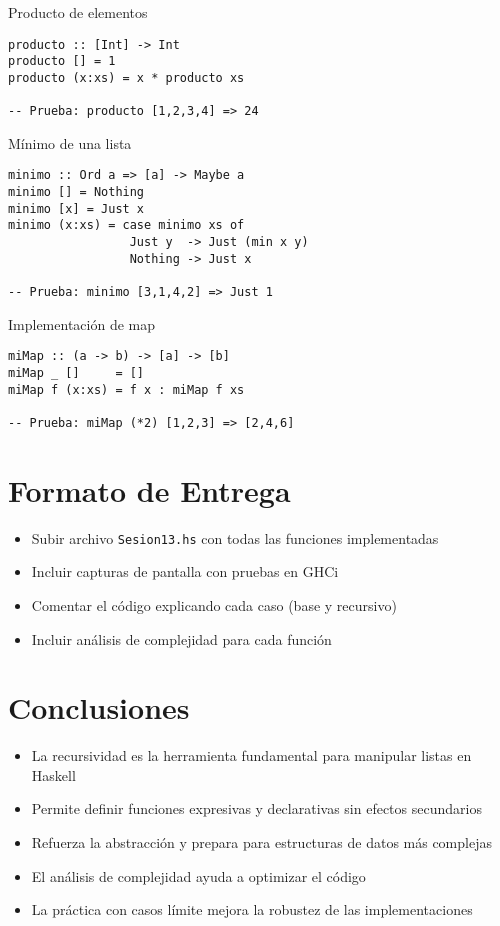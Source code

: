\documentclass[12pt]{article}
\begin{document}
\begin{solucion}{Producto de elementos}
\begin{lstlisting}
producto :: [Int] -> Int
producto [] = 1
producto (x:xs) = x * producto xs

-- Prueba: producto [1,2,3,4] => 24
\end{lstlisting}
\end{solucion}

\begin{solucion}{Mínimo de una lista}
\begin{lstlisting}
minimo :: Ord a => [a] -> Maybe a
minimo [] = Nothing
minimo [x] = Just x
minimo (x:xs) = case minimo xs of
                 Just y  -> Just (min x y)
                 Nothing -> Just x

-- Prueba: minimo [3,1,4,2] => Just 1
\end{lstlisting}
\end{solucion}

\begin{solucion}{Implementación de map}
\begin{lstlisting}
miMap :: (a -> b) -> [a] -> [b]
miMap _ []     = []
miMap f (x:xs) = f x : miMap f xs

-- Prueba: miMap (*2) [1,2,3] => [2,4,6]
\end{lstlisting}
\end{solucion}

\section*{Formato de Entrega}
\begin{itemize}
  \item Subir archivo \texttt{Sesion13.hs} con todas las funciones implementadas
  \item Incluir capturas de pantalla con pruebas en GHCi
  \item Comentar el código explicando cada caso (base y recursivo)
  \item Incluir análisis de complejidad para cada función
\end{itemize}

\section*{Conclusiones}
\begin{itemize}
  \item La recursividad es la herramienta fundamental para manipular listas en Haskell
  \item Permite definir funciones expresivas y declarativas sin efectos secundarios
  \item Refuerza la abstracción y prepara para estructuras de datos más complejas
  \item El análisis de complejidad ayuda a optimizar el código
  \item La práctica con casos límite mejora la robustez de las implementaciones
\end{itemize}
\end{document}
